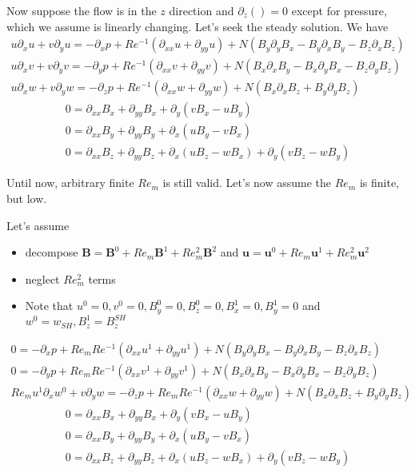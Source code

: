 \documentclass[11pt]{article}
\newcommand{\B}{\mathbf{B}}
\newcommand{\U}{\mathbf{u}}
\newcommand{\PD}{\partial}
\begin{document}
Now suppose the flow is in the $z$ direction and $\PD_z() = 0$ except for pressure, which we assume is linearly changing. Let's seek the steady solution. We have
\begin{equation}\begin{aligned}
u\PD_x u+v\PD_y u=-\PD_x p+Re^{-1}(\PD_{xx} u+\PD_{yy} u)+N(B_y \PD_y B_x - B_y \PD_x B_y - B_z \PD_x B_z) \\
u\PD_x v+v\PD_y v=-\PD_y p+Re^{-1}(\PD_{xx} v+\PD_{yy} v)+N(B_x \PD_x B_y - B_x \PD_y B_x - B_z \PD_y B_z) \\
u\PD_x w+v\PD_y w=-\PD_z p+Re^{-1}(\PD_{xx} w+\PD_{yy} w)+N(B_x \PD_x B_z + B_y \PD_y B_z)
\end{aligned} \end{equation}
\begin{equation}\begin{aligned}
0=\PD_{xx}B_x+\PD_{yy}B_x + \PD_y (v B_x - u B_y) \\
0=\PD_{xx}B_y+\PD_{yy}B_y + \PD_x (u B_y - v B_x) \\
0=\PD_{xx}B_z+\PD_{yy}B_z + \PD_x (u B_z - w B_x) + \PD_y (v B_z - w B_y)
\end{aligned} \end{equation}

Until now, arbitrary finite $Re_m$ is still valid. Let's now assume the $Re_m$ is finite, but low. 

Let's assume
\begin{itemize}
\item decompose $\B = \B^0 + Re_m \B^1 + Re_m^2 \B^2$ and $\U = \U^0 + Re_m \U^1 + Re_m^2 \U^2$
\item neglect $Re_m^2$ terms
\item Note that $u^0=0,v^0=0,B_y^0=0,B_z^0=0,B_x^1=0,B_y^1=0$ and $w^0=w_{SH},B_z^1 = B_z^{SH}$
\end{itemize}

\begin{equation}\begin{aligned}
0=-\PD_x p+Re_m Re^{-1}(\PD_{xx} u^1+\PD_{yy} u^1)+N(B_y \PD_y B_x - B_y \PD_x B_y - B_z \PD_x B_z) \\
0=-\PD_y p+Re_m Re^{-1}(\PD_{xx} v^1+\PD_{yy} v^1)+N(B_x \PD_x B_y - B_x \PD_y B_x - B_z \PD_y B_z) \\
Re_m u^1\PD_x w^0+v\PD_y w=-\PD_z p+Re_m Re^{-1}(\PD_{xx} w+\PD_{yy} w)+N(B_x \PD_x B_z + B_y \PD_y B_z)
\end{aligned} \end{equation}
\begin{equation}\begin{aligned}
0=\PD_{xx}B_x+\PD_{yy}B_x + \PD_y (v B_x - u B_y) \\
0=\PD_{xx}B_y+\PD_{yy}B_y + \PD_x (u B_y - v B_x) \\
0=\PD_{xx}B_z+\PD_{yy}B_z + \PD_x (u B_z - w B_x) + \PD_y (v B_z - w B_y)
\end{aligned} \end{equation}
\end{document}
